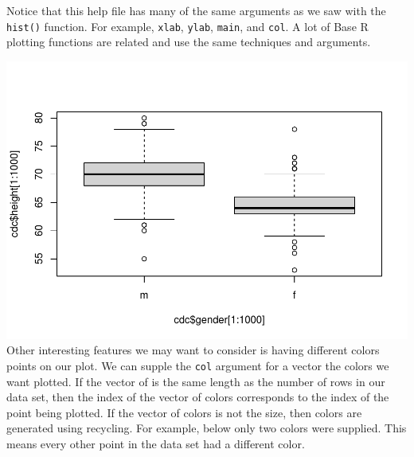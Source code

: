 \documentclass[
]{book}
\newenvironment{Shaded}{\begin{snugshade}}{\end{snugshade}}
\newcommand{\CommentTok}[1]{\textcolor[rgb]{0.56,0.35,0.01}{\textit{#1}}}
\newcommand{\DataTypeTok}[1]{\textcolor[rgb]{0.13,0.29,0.53}{#1}}
\newcommand{\KeywordTok}[1]{\textcolor[rgb]{0.13,0.29,0.53}{\textbf{#1}}}
\newcommand{\NormalTok}[1]{#1}
\newcommand{\OperatorTok}[1]{\textcolor[rgb]{0.81,0.36,0.00}{\textbf{#1}}}
\newcommand{\StringTok}[1]{\textcolor[rgb]{0.31,0.60,0.02}{#1}}
\begin{document}
Notice that this help file has many of the same arguments as we saw with the \texttt{hist()} function. For example, \texttt{xlab}, \texttt{ylab}, \texttt{main}, and \texttt{col}. A lot of Base R plotting functions are related and use the same techniques and arguments.

\begin{Shaded}
\end{Shaded}

\includegraphics{_main_files/figure-latex/unnamed-chunk-178-1.pdf}
Other interesting features we may want to consider is having different colors points on our plot. We can supple the \texttt{col} argument for a vector the colors we want plotted. If the vector of is the same length as the number of rows in our data set, then the index of the vector of colors corresponds to the index of the point being plotted. If the vector of colors is not the size, then colors are generated using recycling. For example, below only two colors were supplied. This means every other point in the data set had a different color.

\begin{Shaded}
\end{Shaded}
\end{document}
